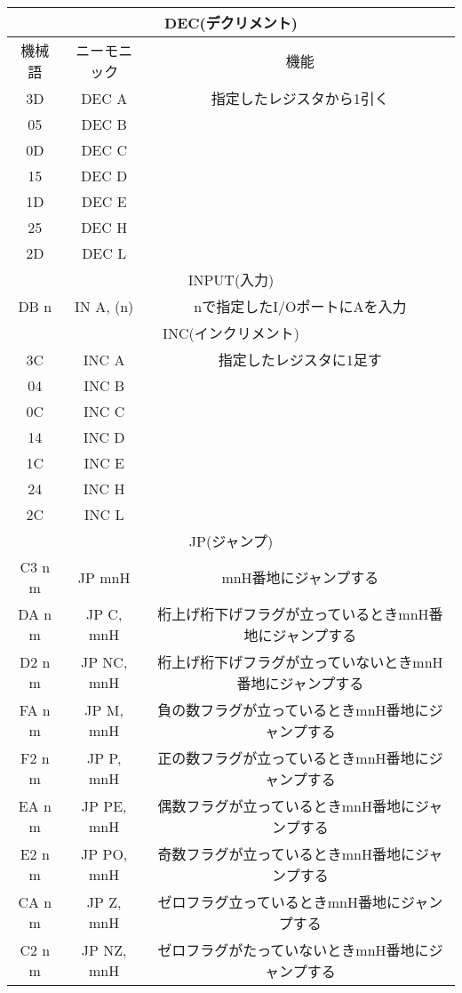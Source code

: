 \begin{center}
\begin{tabular}{|c|c|c|}
\hline
\multicolumn{3}{|c|}{DEC(デクリメント)}\\
\hline
機械語& ニーモニック& 機能 \\ \hline
3D& DEC A& 指定したレジスタから1引く\\ \hline
05& DEC B& \\ \hline
0D& DEC C& \\ \hline
15& DEC D& \\ \hline
1D& DEC E& \\ \hline
25& DEC H& \\ \hline
2D& DEC L& \\ \hline
\hline
\multicolumn{3}{|c|}{INPUT(入力)}\\
\hline
DB n& IN A, (n)& nで指定したI/OポートにAを入力\\ \hline
\hline
\multicolumn{3}{|c|}{INC(インクリメント)}\\
\hline
3C& INC A& 指定したレジスタに1足す\\ \hline
04& INC B&\\ \hline
0C& INC C&\\ \hline
14& INC D&\\ \hline
1C& INC E&\\ \hline
24& INC H&\\ \hline
2C& INC L&\\ \hline
\hline
\multicolumn{3}{|c|}{JP(ジャンプ)}\\
\hline
C3 n m& JP mnH& mnH番地にジャンプする\\ \hline
DA n m& JP C, mnH& 桁上げ桁下げフラグが立っているときmnH番地にジャンプする\\ \hline
D2 n m& JP NC, mnH& 桁上げ桁下げフラグが立っていないときmnH番地にジャンプする\\ \hline
FA n m& JP M, mnH& 負の数フラグが立っているときmnH番地にジャンプする\\ \hline
F2 n m& JP P, mnH& 正の数フラグが立っているときmnH番地にジャンプする\\ \hline
EA n m& JP PE, mnH& 偶数フラグが立っているときmnH番地にジャンプする\\ \hline
E2 n m& JP PO, mnH& 奇数フラグが立っているときmnH番地にジャンプする\\ \hline
CA n m& JP Z, mnH& ゼロフラグ立っているときmnH番地にジャンプする\\ \hline
C2 n m& JP NZ, mnH& ゼロフラグがたっていないときmnH番地にジャンプする\\ \hline

\end{tabular}
\end{center}
